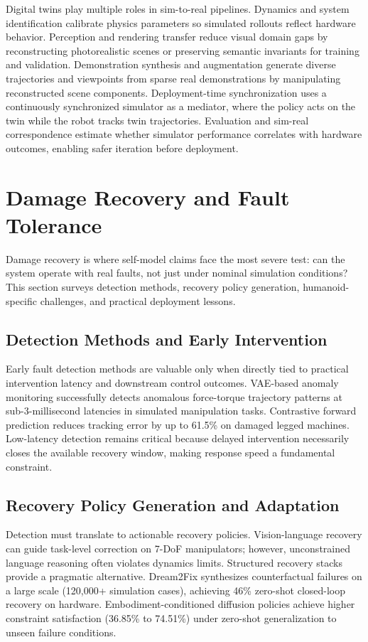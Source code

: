 \documentclass[12pt,a4paper,oneside]{report}
\begin{document}
Digital twins play multiple roles in sim-to-real pipelines. Dynamics and system identification calibrate physics parameters so simulated rollouts reflect hardware behavior. Perception and rendering transfer reduce visual domain gaps by reconstructing photorealistic scenes or preserving semantic invariants for training and validation. Demonstration synthesis and augmentation generate diverse trajectories and viewpoints from sparse real demonstrations by manipulating reconstructed scene components. Deployment-time synchronization uses a continuously synchronized simulator as a mediator, where the policy acts on the twin while the robot tracks twin trajectories. Evaluation and sim-real correspondence estimate whether simulator performance correlates with hardware outcomes, enabling safer iteration before deployment.

\section{Damage Recovery and Fault Tolerance}

Damage recovery is where self-model claims face the most severe test: can the system operate with real faults, not just under nominal simulation conditions? This section surveys detection methods, recovery policy generation, humanoid-specific challenges, and practical deployment lessons.

\subsection{Detection Methods and Early Intervention}

Early fault detection methods are valuable only when directly tied to practical intervention latency and downstream control outcomes. VAE-based anomaly monitoring successfully detects anomalous force-torque trajectory patterns at sub-3-millisecond latencies in simulated manipulation tasks. Contrastive forward prediction reduces tracking error by up to 61.5\% on damaged legged machines. Low-latency detection remains critical because delayed intervention necessarily closes the available recovery window, making response speed a fundamental constraint.

\subsection{Recovery Policy Generation and Adaptation}

Detection must translate to actionable recovery policies. Vision-language recovery can guide task-level correction on 7-DoF manipulators; however, unconstrained language reasoning often violates dynamics limits. Structured recovery stacks provide a pragmatic alternative. Dream2Fix synthesizes counterfactual failures on a large scale (120,000+ simulation cases), achieving 46\% zero-shot closed-loop recovery on hardware. Embodiment-conditioned diffusion policies achieve higher constraint satisfaction (36.85\% to 74.51\%) under zero-shot generalization to unseen failure conditions.
\end{document}
